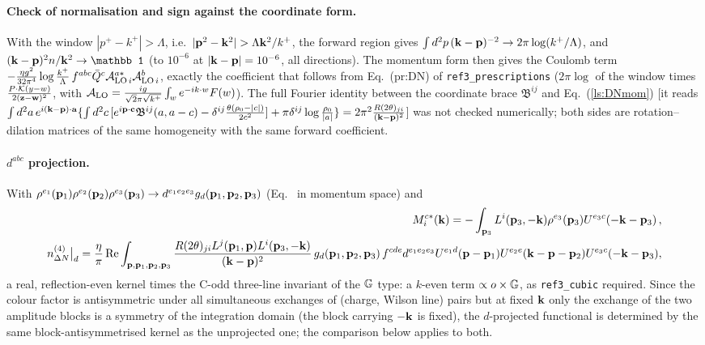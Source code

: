 \paragraph{Check of normalisation and sign against the coordinate form.} With the window $|p^+-k^+|>\Lambda$, i.e.\ $|\v p^2-\v k^2|>\Lambda\v k^2/k^+$, the forward region gives $\int d^2p\,(\mathbf{k}-\mathbf{p})^{-2}\to2\pi\log(k^+/\Lambda)$, and $(\v k-\v p)^2n/\v k^2\to\mathbb 1$ (to $10^{-6}$ at $|\mathbf{k}-\mathbf{p}|=10^{-6}$, all directions). The momentum form then gives the Coulomb term $-\frac{\eta g^2}{32\pi^4}\log\frac{k^+}{\Lambda}\,f^{abc}\bar Q^c\mathcal A^{a*}_{{\rm LO}\,i}\mathcal A^b_{{\rm LO}\,i}$, exactly the coefficient that follows from Eq.~(pr:DN) of \texttt{ref3\_prescriptions} ($2\pi\log$ of the window times $\frac{P\cdot\mathcal K(y-w)}{2(\mathbf{z}-\mathbf{w})^2}$, with $\mathcal A_{\rm LO}=\frac{ig}{\sqrt2\pi\sqrt{k^+}}\int_we^{-ik\cdot w}F(w)$). The full Fourier identity between the coordinate brace $\mathfrak B^{ij}$ and Eq.~(\ref{ls:DNmom}) [it reads $\int d^2a\,e^{i(\mathbf{k}-\mathbf{p})\cdot\mathbf{a}}\{\int d^2c\,[e^{i\mathbf{p}\cdot\mathbf{c}}\mathfrak B^{ij}(a,a-c)-\delta^{ij}\frac{\theta(\rho_0-|c|)}{2c^2}]+\pi\delta^{ij}\log\frac{\rho_0}{|a|}\}=2\pi^2\frac{R(2\theta)_{ji}}{(\mathbf{k}-\mathbf{p})^2}$] was not checked numerically; both sides are rotation--dilation matrices of the same homogeneity with the same forward coefficient.
\paragraph{$d^{abc}$ projection.} With $\rho^{e_1}(\mathbf{p}_1)\rho^{e_2}(\mathbf{p}_2)\rho^{e_3}(\mathbf{p}_3)\to d^{e_1e_2e_3}g_d(\mathbf{p}_1,\mathbf{p}_2,\mathbf{p}_3)$ (Eq.~ in momentum space) and
\begin{align}
M^{c*}_i(\mathbf{k})=-\int_{\mathbf{p}_3}L^i(\mathbf{p}_3,-\mathbf{k})\rho^{e_3}(\mathbf{p}_3)U^{e_3c}(-\mathbf{k}-\mathbf{p}_3)\,,\notag\\
n^{(4)}_{\Delta N}\big|_d=\frac\eta\pi\,{\rm Re}\int_{\mathbf{p},\mathbf{p}_1,\mathbf{p}_2,\mathbf{p}_3}\frac{R(2\theta)_{ji}L^j(\mathbf{p}_1,\mathbf{p})L^i(\mathbf{p}_3,-\mathbf{k})}{(\mathbf{k}-\mathbf{p})^2}\,g_d(\mathbf{p}_1,\mathbf{p}_2,\mathbf{p}_3)\,
f^{cde}d^{e_1e_2e_3}U^{e_1d}(\mathbf{p}-\mathbf{p}_1)U^{e_2e}(\mathbf{k}-\mathbf{p}-\mathbf{p}_2)U^{e_3c}(-\mathbf{k}-\mathbf{p}_3),
\end{align}
a real, reflection-even kernel times the C-odd three-line invariant of the $\mathbb{G}$ type: a $k$-even term $\propto o\times\mathbb{G}$, as \texttt{ref3\_cubic} required. Since the colour factor is antisymmetric under all simultaneous exchanges of (charge, Wilson line) pairs but at fixed $\mathbf{k}$ only the exchange of the two amplitude blocks is a symmetry of the integration domain (the block carrying $-\mathbf{k}$ is fixed), the $d$-projected functional is determined by the same block-antisymmetrised kernel as the unprojected one; the comparison below applies to both.

